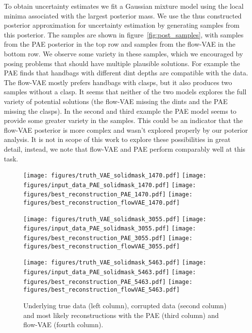 \documentclass[10pt]{article} \usepackage[accepted]{tmlr}
\begin{document}
To obtain uncertainty estimates we fit a Gaussian mixture model using the local minima associated with the largest posterior mass. We use the thus constructed posterior approximation for uncertainty estimation by generating samples from this posterior. The samples are shown in figure~\ref{fig:post_samples}, with samples from the PAE posterior in the top row and samples from the flow-VAE in the bottom row. We observe some variety in these samples, which we encouraged by posing problems that should have multiple plausible solutions. For example the PAE finds that handbags with different dint depths are compatible with the data. The flow-VAE mostly prefers handbags with clasps, but it also produces two samples without a clasp. It seems that neither of the two models explores the full variety of potential solutions (the flow-VAE missing the dints and the PAE missing the clasps). In the second and third example the PAE model seems to provide some greater variety in the samples. This could be an indicator that the flow-VAE posterior is more complex and wasn't explored properly by our poterior analysis. It is not in scope of this work to explore these possibilities in great detail, instead, we note that flow-VAE and PAE perform comparably well at this task. 
\begin{figure}
\begin{center}
\texttt{[image: figures/truth\_VAE\_solidmask\_1470.pdf]}
\texttt{[image: figures/input\_data\_PAE\_solidmask\_1470.pdf]}
\texttt{[image: figures/best\_reconstruction\_PAE\_1470.pdf]}
\texttt{[image: figures/best\_reconstruction\_flowVAE\_1470.pdf]}

\texttt{[image: figures/truth\_VAE\_solidmask\_3055.pdf]}
\texttt{[image: figures/input\_data\_PAE\_solidmask\_3055.pdf]}
\texttt{[image: figures/best\_reconstruction\_PAE\_3055.pdf]}
\texttt{[image: figures/best\_reconstruction\_flowVAE\_3055.pdf]}


\texttt{[image: figures/truth\_VAE\_solidmask\_5463.pdf]}
\texttt{[image: figures/input\_data\_PAE\_solidmask\_5463.pdf]}
\texttt{[image: figures/best\_reconstruction\_PAE\_5463.pdf]}
\texttt{[image: figures/best\_reconstruction\_flowVAE\_5463.pdf]}

\end{center}
\caption{Underlying true data (left column), corrupted data (second column) and most likely reconstructions with the PAE (third column) and flow-VAE (fourth column).
\label{fig:inpaint_denois}}
\end{figure}
\end{document}

